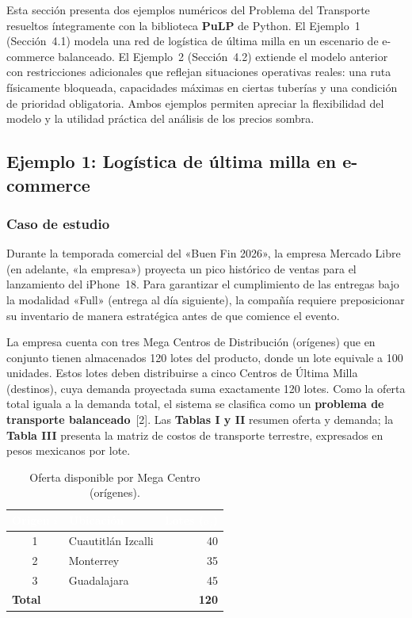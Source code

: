 \documentclass[10pt,letterpaper,twocolumn]{article}
\begin{document}
Esta sección presenta dos ejemplos numéricos del Problema del Transporte resueltos íntegramente con la biblioteca \textbf{PuLP} de Python. El Ejemplo~1 (Sección~4.1) modela una red de logística de última milla en un escenario de e-commerce balanceado. El Ejemplo~2 (Sección~4.2) extiende el modelo anterior con restricciones adicionales que reflejan situaciones operativas reales: una ruta físicamente bloqueada, capacidades máximas en ciertas tuberías y una condición de prioridad obligatoria. Ambos ejemplos permiten apreciar la flexibilidad del modelo y la utilidad práctica del análisis de los precios sombra.

\subsection{Ejemplo 1: Logística de última milla en e-commerce}

\subsubsection{Caso de estudio}
Durante la temporada comercial del «Buen Fin 2026», la empresa Mercado Libre (en adelante, «la empresa») proyecta un pico histórico de ventas para el lanzamiento del iPhone~18. Para garantizar el cumplimiento de las entregas bajo la modalidad «Full» (entrega al día siguiente), la compañía requiere preposicionar su inventario de manera estratégica antes de que comience el evento.

La empresa cuenta con tres Mega Centros de Distribución (orígenes) que en conjunto tienen almacenados 120 lotes del producto, donde un lote equivale a 100 unidades. Estos lotes deben distribuirse a cinco Centros de Última Milla (destinos), cuya demanda proyectada suma exactamente 120 lotes. Como la oferta total iguala a la demanda total, el sistema se clasifica como un \textbf{problema de transporte balanceado}~[2]. Las \textbf{Tablas I y II} resumen oferta y demanda; la \textbf{Tabla III} presenta la matriz de costos de transporte terrestre, expresados en pesos mexicanos por lote.

\begin{table}[!h]
\caption{Oferta disponible por Mega Centro (orígenes).}
\centering
\small
\begin{tabular}{c l r}
\arrayrulecolor{infotec}\toprule
\rowcolor{infotec}\textcolor{white}{\textbf{Origen $i$}} & \textcolor{white}{\textbf{Ubicación}} & \textcolor{white}{\textbf{Lotes ($a_i$)}} \\
\midrule
1 & Cuautitlán Izcalli & 40 \\
2 & Monterrey & 35 \\
3 & Guadalajara & 45 \\
\midrule
\multicolumn{2}{l}{\textbf{Total}} & \textbf{120} \\
\bottomrule
\end{tabular}
\end{table}
\end{document}
